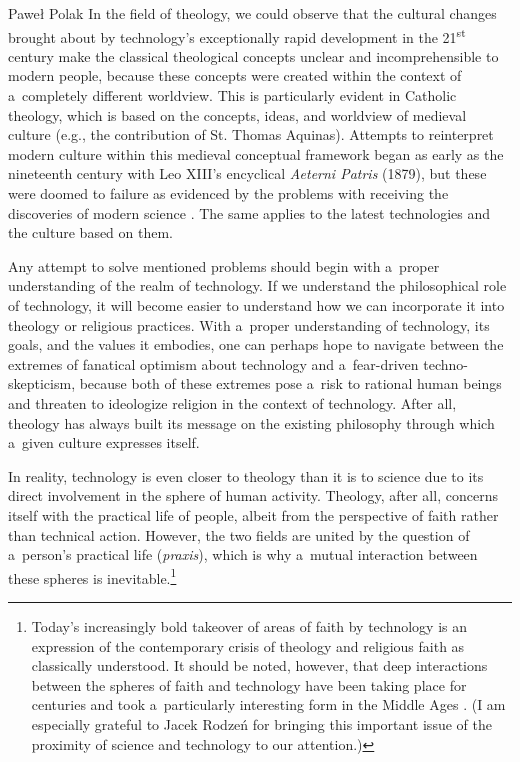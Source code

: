 \begin{artengenv}{Paweł Polak}
In the field of theology, we could observe that the cultural changes brought about by technology's exceptionally rapid development in the 21\textsuperscript{st} century make the classical theological concepts unclear and incomprehensible to modern people, because these concepts were created within the context of a~completely different worldview. This is particularly evident in Catholic theology, which is based on the concepts, ideas, and worldview of medieval culture (e.g., the contribution of St. Thomas Aquinas). Attempts to reinterpret modern culture within this medieval conceptual framework began as early as the nineteenth century with Leo XIII's encyclical \textit{Aeterni Patris} (1879), but these were doomed to failure as evidenced by the problems with receiving the discoveries of modern science 
\parencite[][]{polak_theory_2023}. %
 The same applies to the latest technologies and the culture based on them.



Any attempt to solve mentioned problems should begin with a~proper understanding of the realm of technology. If we understand the philosophical role of technology, it will become easier to understand how we can incorporate it into theology or religious practices. With a~proper understanding of technology, its goals, and the values it embodies, one can perhaps hope to navigate between the extremes of fanatical optimism about technology and a~fear-driven techno-skepticism, because both of these extremes pose a~risk to rational human beings and threaten to ideologize religion in the context of technology. After all, theology has always built its message on the existing philosophy through which a~given culture expresses itself.



In reality, technology is even closer to theology than it is to science due to its direct involvement in the sphere of human activity. Theology, after all, concerns itself with the practical life of people, albeit from the perspective of faith rather than technical action. However, the two fields are united by the question of a~person's practical life (\textit{praxis}), which is why a~mutual interaction between these spheres is inevitable.\footnote{Today's increasingly bold takeover of areas of faith by technology 
\parencite[see, e.g.,][]{wildman_spirit_2021} %
 is an expression of the contemporary crisis of theology and religious faith as classically understood. It should be noted, however, that deep interactions between the spheres of faith and technology have been taking place for centuries and took a~particularly interesting form in the Middle Ages 
\parencite[][]{ovitt_restoration_1987}. %
 (I am especially grateful to Jacek Rodzeń for bringing this important issue of the proximity of science and technology to our attention.)}




\end{artengenv}
